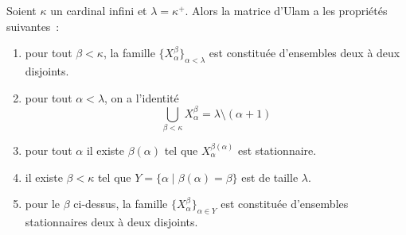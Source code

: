 \begin{property}
  Soient $\kappa$ un cardinal infini et $\lambda = \kappa^+$. Alors la matrice
  d'Ulam a les propriétés suivantes~:
  \begin{enumerate}[label=(\roman*)]
  \item\label{enum.ulam1} pour tout $\beta < \kappa$, la famille
    $\{X_\alpha^\beta\}_{\alpha < \lambda}$ est constituée d'ensembles deux à deux
    disjoints.
  \item\label{enum.ulam2} pour tout $\alpha < \lambda$, on a l'identité
    \[\bigcup_{\beta < \kappa} X_\alpha^\beta = \lambda \setminus (\alpha + 1)\]
  \item pour tout $\alpha$ il existe $\beta(\alpha)$ tel que
    $X_\alpha^{\beta(\alpha)}$ est stationnaire.
  \item il existe $\beta < \kappa$ tel que
    $Y = \{\alpha \mid \beta(\alpha) = \beta\}$ est de taille $\lambda$.
  \item pour le $\beta$ ci-dessus, la famille
    $\{X_\alpha^\beta\}_{\alpha \in Y}$ est constituée d'ensembles stationnaires
    deux à deux disjoints.
  \end{enumerate}
\end{property}

